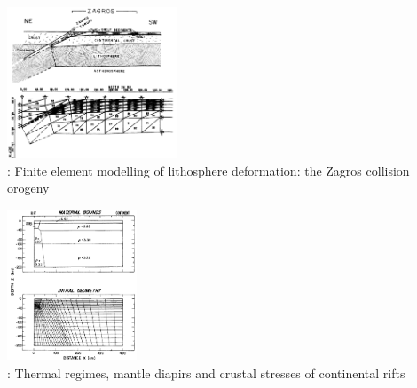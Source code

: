 \begin{center}
\begin{minipage}{0.45\textwidth}
\centering
\includegraphics[height=4.5cm]{images/history/bird78b}\\
{: Finite element modelling of lithosphere deformation: the Zagros collision 
orogeny \cite{bird78b}}
\end{minipage}\hfill
\begin{minipage}{0.45\textwidth}
\centering
\includegraphics[height=4.5cm]{images/history/brpo81}\\
{: Thermal regimes, mantle diapirs and crustal stresses of continental rifts \cite{brpo81}}
\end{minipage}
\end{center}


